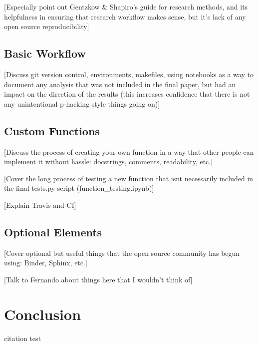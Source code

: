 \documentclass[12pt]{article}
\begin{document}
[Especially point out Gentzkow \& Shapiro's guide for research methods, and its helpfulness in ensuring that research workflow makes sense, but it's lack of any open source reproducibility]

\subsection{Basic Workflow}
[Discuss git version control, environments, makefiles, using notebooks as a way to document any analysis that was not included in the final paper, but had an impact on the direction of the results (this increases confidence that there is not any unintentional p-hacking style things going on)]

\subsection{Custom Functions}
[Discuss the process of creating your own function in  a way that other people can implement it without hassle: docstrings, comments, readability, etc.]

[Cover the long process of testing a new function that isnt necessarily included in the final tests.py script (function\_testing.ipynb)]

[Explain Travis and CI]

\subsection{Optional Elements}
[Cover optional but useful things that the open source community has begun using: Binder, Sphinx, etc.]

[Talk to Fernando about things here that I wouldn't think of]


\newpage
\section{Conclusion}

\newpage
citation test \cite{lasso, latexcompanion, IV_orig}



\end{document}
